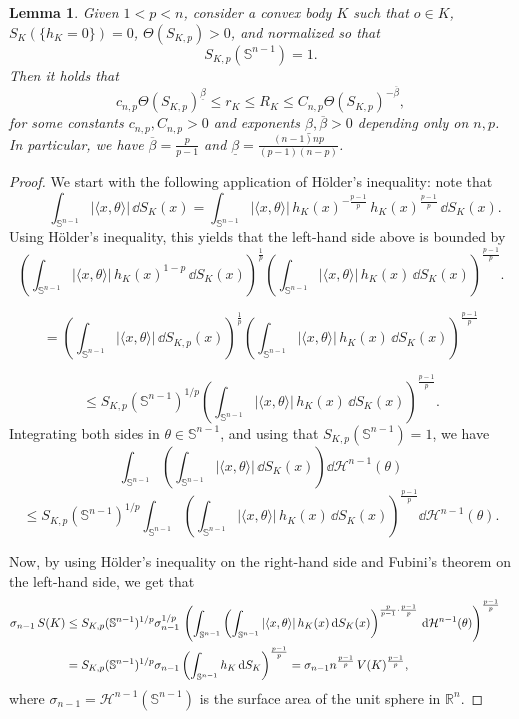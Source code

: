 \documentclass[a4paper, 10pt, twoside]{amsart}
\numberwithin{equation}{section}
\newcommand{\lemmname}{Lemma}
\theoremstyle{plain}
\newtheorem{lemma}[theorem]{\lemmname}
\theoremstyle{definition}
\begin{document}
\begin{lemma}\label{lemma.rR_Lp<n}
    Given $1<p<n$, consider a convex body $K$ such that $o \in K$, $S_K(\{h_K=0\})=0$, $\Theta(S_{K,p}) > 0$, and normalized so that 
    \[
        S_{K,p}(\mathbb{S}^{n-1}) = 1.
    \]
    Then it holds that
    \[
        c_{n,p} \Theta(S_{K,p})^{\underline{\beta}} 
        \le r_K \le R_K 
        \le C_{n,p} \Theta(S_{K,p})^{-\overline{\beta}},
    \] 
    for some constants $c_{n,p},C_{n,p} > 0$ and exponents $\underline{\beta},\overline{\beta} > 0$ depending only on $n,p$. In particular, we have $\overline{\beta} = \frac{p}{p-1}$ and $\underline{\beta} = \frac{(n-1)np}{(p-1)(n-p)}$.
\end{lemma}
\begin{proof} We start with the following application of H\"older's inequality: note that 
\[
\qquad
\int_{\mathbb S^{n-1}} |\langle x,\theta\rangle|\, \dd S_K(x)
=
\int_{\mathbb S^{n-1}}
|\langle x,\theta\rangle|\,
h_K(x)^{-\frac{p-1}{p}}\,
h_K(x)^{\frac{p-1}{p}}\,
\dd S_K(x).
\]
Using H\"older's inequality, this yields that the left-hand side above is bounded by
\[
\left(
\int_{\mathbb S^{n-1}}
|\langle x,\theta\rangle|\,
h_K(x)^{1-p}\,\dd S_K(x)
\right)^{\frac1p}
\left(
\int_{\mathbb S^{n-1}}
|\langle x,\theta\rangle|\,
h_K(x)\,
\dd S_K(x)
\right)^{\frac{p-1}{p}} .
\]

\[
=
\left(
\int_{\mathbb S^{n-1}}
|\langle x,\theta\rangle|\, \dd S_{K,p}(x)
\right)^{\frac1p}
\left(
\int_{\mathbb S^{n-1}}
|\langle x,\theta\rangle|\,
h_K(x)\,
\dd S_K(x)
\right)^{\frac{p-1}{p}}
\]

\[
\le
S_{K,p}(\mathbb S^{n-1})^{1/p}
\left(
\int_{\mathbb S^{n-1}}
|\langle x,\theta\rangle|\,
h_K(x)\,
\dd S_K(x)
\right)^{\frac{p-1}{p}} .
\]
Integrating both sides in $\theta \in \mathbb{S}^{n-1}$, and using that $S_{K,p}(\mathbb S^{n-1}) = 1$, we have 
\[
\int_{\mathbb S^{n-1}}
\left(
\int_{\mathbb S^{n-1}}
|\langle x,\theta\rangle|\, \dd S_K(x)
\right)
\dd \mathcal{H}^{n-1}(\theta)\]
\[
\le
S_{K,p}(\mathbb S^{n-1})^{1/p}
\int_{\mathbb S^{n-1}}
\left(
\int_{\mathbb S^{n-1}}
|\langle x,\theta\rangle|\, h_K(x)\, \dd S_K(x)
\right)^{\frac{p-1}{p}}
\dd \mathcal{H}^{n-1}(\theta).
\]

Now, by using H\"older's inequality on the right-hand side and Fubini's theorem on the left-hand side, we get that 
\begin{align}\label{eq.upper-bound-perimeter}
    \sigma_{n-1}\, S(K)
    & \le 
    S_{K,p}(\mathbb S^{n-1})^{1/p}
    \sigma_{n-1}^{1/p}\,
    \left(
    \int_{\mathbb S^{n-1}}
    \left(
        \int_{\mathbb S^{n-1}} 
        |\langle x,\theta\rangle|\, h_K(x)\, {\rm d} S_K(x)
    \right)^{\frac{p}{p-1} \cdot \frac{p-1}{p}}
    \, {\rm d} \mathcal{H}^{n-1}(\theta)
    \right)^{\frac{p-1}{p}}  \cr 
    & = 
    S_{K,p}(\mathbb S^{n-1})^{1/p}
    \sigma_{n-1}
    \left(
        \int_{\mathbb S^{n-1}} h_K\, {\rm d} S_K
    \right)^{\frac{p-1}{p}} 
    = \sigma_{n-1}n^{\frac{p-1}{p}}\, V(K)^{\frac{p-1}{p}},
\end{align} 
where $\sigma_{n-1} = \mathcal{H}^{n-1}(\mathbb{S}^{n-1})$ is the surface area of the unit sphere in $\mathbb{R}^n$. 


\end{proof}
\end{document}
